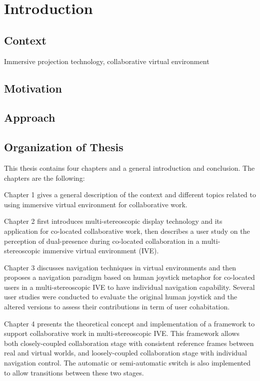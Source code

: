 \chapter*{Introduction}
\mtcaddchapter[Introduction]

\section*{Context}

Immersive projection technology, collaborative virtual environment

\section*{Motivation}

\section*{Approach}

\section*{Organization of Thesis}
This thesis contains four chapters and a general introduction and conclusion. The chapters are the following:

Chapter 1 gives a general description of the context and different topics related to using immersive virtual environment for collaborative work.

Chapter 2 first introduces multi-stereoscopic display technology and its application for co-located collaborative work, then describes a user study on the perception of dual-presence during co-located collaboration in a multi-stereoscopic immersive virtual environment (IVE).

Chapter 3 discusses navigation techniques in virtual environments and then proposes a navigation paradigm based on human joystick metaphor for co-located users in a multi-stereoscopic IVE to have individual navigation capability. Several user studies were conducted to evaluate the original human joystick and the altered versions to assess their contributions in term of user cohabitation.

Chapter 4 presents the theoretical concept and implementation of a framework to support collaborative work in multi-stereoscopic IVE. This framework allows both closely-coupled collaboration stage with consistent reference frames between real and virtual worlds, and loosely-coupled collaboration stage with individual navigation control. The automatic or semi-automatic switch is also implemented to allow transitions between these two stages.